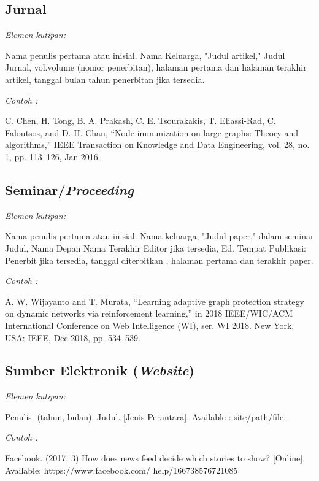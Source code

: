 \documentclass[conference, a4paper]{IEEEtran_ID}
\begin{document}
\subsection{Jurnal}

	\textit{Elemen kutipan:}

	Nama penulis pertama atau inisial. Nama Keluarga, "Judul artikel," Judul Jurnal, vol.volume (nomor penerbitan), halaman pertama dan halaman terakhir artikel, tanggal bulan tahun penerbitan jika tersedia.

	\textit{Contoh \cite{pustaka3}:}

	C. Chen, H. Tong, B. A. Prakash, C. E. Tsourakakis, T. Eliassi-Rad, C. Faloutsos, and D. H. Chau, “Node immunization on large graphs: Theory and algorithms,” IEEE Transaction on Knowledge and Data Engineering, vol. 28, no. 1, pp. 113–126, Jan 2016.

\subsection{Seminar/\textit{Proceeding}}

	\textit{Elemen kutipan:}

	Nama penulis pertama atau inisial. Nama keluarga, "Judul paper," dalam seminar Judul, Nama Depan Nama Terakhir Editor jika tersedia, Ed. Tempat Publikasi: Penerbit jika tersedia,  tanggal diterbitkan , halaman pertama dan terakhir paper.

	\textit{Contoh \cite{pustaka4}:}

	A. W. Wijayanto and T. Murata, “Learning adaptive graph protection strategy on dynamic networks via reinforcement learning,” in 2018 IEEE/WIC/ACM International Conference on Web Intelligence (WI), ser. WI 2018. New York, USA: IEEE, Dec 2018, pp. 534–539.

\subsection{Sumber Elektronik (\textit{Website})}

	\textit{Elemen kutipan:}

	Penulis. (tahun, bulan). Judul. [Jenis Perantara]. Available : site/path/file.

	\textit{Contoh \cite{pustaka5}:}

	Facebook. (2017, 3) How does news feed decide which stories to show? [Online]. Available: https://www.facebook.com/ help/166738576721085
	


\end{document}
